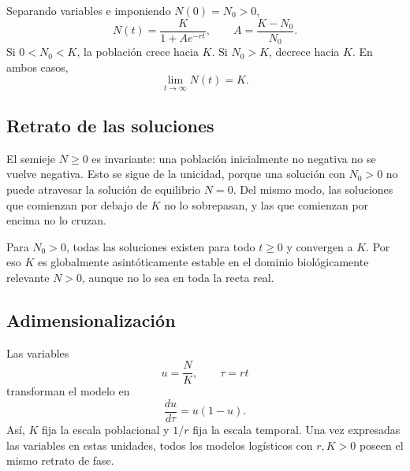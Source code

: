 \documentclass[12pt,a4paper]{article}
\begin{document}
	Separando variables e imponiendo \(N(0)=N_0>0\),
	\[
	N(t)
	=
	\frac{K}{1+A e^{-rt}},
	\qquad
	A=\frac{K-N_0}{N_0}.
	\]
Si \(0<N_0<K\), la población crece hacia \(K\). Si \(N_0>K\), decrece hacia \(K\). En ambos casos,
	\[
	\lim_{t\to\infty}N(t)=K.
	\]

	\subsection{Retrato de las soluciones}

	\begin{center}
	\end{center}

	El semieje \(N\geq0\) es invariante: una población inicialmente no negativa no se vuelve negativa. Esto se sigue de la unicidad, porque una solución con \(N_0>0\) no puede atravesar la solución de equilibrio \(N=0\). Del mismo modo, las soluciones que comienzan por debajo de \(K\) no lo sobrepasan, y las que comienzan por encima no lo cruzan.

	Para \(N_0>0\), todas las soluciones existen para todo \(t\geq0\) y convergen a \(K\). Por eso \(K\) es globalmente asintóticamente estable en el dominio biológicamente relevante \(N>0\), aunque no lo sea en toda la recta real.

	\subsection{Adimensionalización}

	Las variables
	\[
	u=\frac{N}{K},
	\qquad
	\tau=rt
	\]
transforman el modelo en
	\[
	\frac{du}{d\tau}=u(1-u).
	\]
Así, \(K\) fija la escala poblacional y \(1/r\) fija la escala temporal. Una vez expresadas las variables en estas unidades, todos los modelos logísticos con \(r,K>0\) poseen el mismo retrato de fase.
\end{document}
